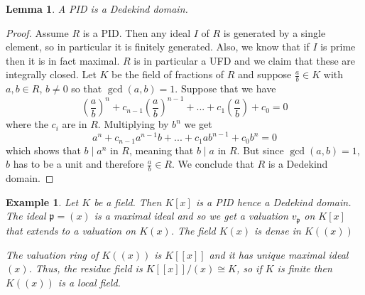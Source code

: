 \documentclass{article}
\newtheorem{lemma}{Lemma}[section]
\newtheorem{example}{Example}[section]
\newcommand{\mfrak}[1]{\mathfrak{#1}}
\begin{document}
\begin{lemma}
    A PID is a Dedekind domain.
\end{lemma}
\begin{proof}
    Assume $R$ is a PID. Then any ideal $I$ of $R$ is generated by a single element, so in particular it is finitely generated. Also, we know that if $I$ is prime then it is in fact maximal. $R$ is in particular a UFD and we claim that these are integrally closed. Let $K$ be the field of fractions of $R$ and suppose $\frac{a}{b} \in K$ with $a,b \in R$, $b \neq 0$ so that $\gcd(a, b) = 1$. Suppose that we have
    $$(\frac{a}{b})^n + c_{n-1}(\frac{a}{b})^{n-1} + ... + c_{1}(\frac{a}{b}) + c_0 = 0$$
    where the $c_i$ are in $R$. Multiplying by $b^n$ we get
    $$a^n + c_{n-1}a^{n-1}b + ... + c_{1}ab^{n-1} + c_0 b^n = 0$$
    which shows that $b \mid a^n$ in $R$, meaning that $b \mid a$ in $R$. But since $\gcd(a,b) = 1$, $b$ has to be a unit and therefore $\frac{a}{b} \in R$. We conclude that $R$ is a Dedekind domain. 
\end{proof}


\begin{example}
    Let $K$ be a field. Then $K[x]$ is a PID hence a Dedekind domain. The ideal $\mfrak p = (x)$ is a maximal ideal and so we get a valuation $v_\mfrak p$ on $K[x]$ that extends to a valuation on $K(x)$. The field $K(x)$ is dense in $K((x))$ 
    
    The valuation ring of $K((x))$ is $K[[x]]$ and it has unique maximal ideal $(x)$. Thus, the residue field is $K[[x]] / (x) \cong K$, so if $K$ is finite then $K((x))$ is a local field. 
\end{example}
\end{document}
